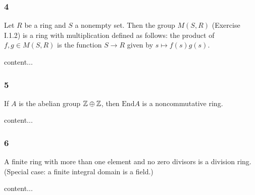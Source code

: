 \subsubsection*{4}
\begin{graybox}
	Let $R$ be a ring and $S$ a nonempty set. Then the group $M(S,R)$ (Exercise I.1.2) is a ring with multiplication defined as follows: the product of $f, g \in M(S,R)$ is the function $S \to R$ given by $s \mapsto f(s)g(s)$.
\end{graybox}
\begin{solution}
	content...
\end{solution}

\subsubsection*{5}
\begin{graybox}
	If $A$ is the abelian group $\mathbb{Z} \oplus \mathbb{Z}$, then $\text{End} A$ is a noncommutative ring.
\end{graybox}
\begin{solution}
	content...
\end{solution}

\subsubsection*{6}
\begin{graybox}
	A finite ring with more than one element and no zero divisors is a division ring. (Special case: a finite integral domain is a field.)
\end{graybox}
\begin{solution}
	content...
\end{solution}


